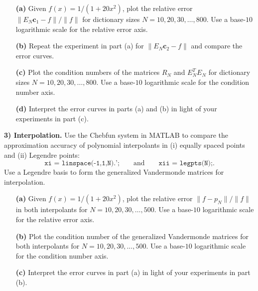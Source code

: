 \documentclass[12pt]{article}
\begin{document}
\begin{itemize}

	\item[\textbf{(a)}] Given $f(x) = 1/(1+20x^2)$, plot the relative error $\|E_N\mathbf{c}_1-f\|/\|f\|$ for dictionary sizes $N=10,20,30,\ldots,800$. Use a base-$10$ logarithmic scale for the relative error axis. 

	\item[\textbf{(b)}] Repeat the experiment in part (a) for $\|E_N\mathbf{c}_2-f\|$ and compare the error curves. 

	\item[\textbf{(c)}] Plot the condition numbers of the matrices $R_N$ and $E_N^TE_N$ for dictionary sizes $N=10,20,30,\ldots,800$. Use a base-$10$ logarithmic scale for the condition number axis. 

	\item[\textbf{(d)}] Interpret the error curves in parts (a) and (b) in light of your experiments in part (c).

\end{itemize} 

\bigskip

\noindent
\textbf{3) Interpolation.} Use the Chebfun system in MATLAB to compare the approximation accuracy of polynomial interpolants in (i) equally spaced points and (ii) Legendre points:
$$
\texttt{xi = linspace(-1,1,N).';} \qquad \text{and} \qquad \texttt{xii = legpts(N);}.
$$
Use a Legendre basis to form the generalized Vandermonde matrices for interpolation.

\begin{itemize}

	\item[\textbf{(a)}]  Given $f(x) = 1/(1+20x^2)$, plot the relative error $\|f-p_N\|/\|f\|$ in both interpolants for $N=10,20,30,\ldots,500$. Use a base-$10$ logarithmic scale for the relative error axis. 

	\item[\textbf{(b)}] Plot the condition number of the generalized Vandermonde matrices for both interpolants for $N=10,20,30,\ldots,500$. Use a base-$10$ logarithmic scale for the condition number axis. 

	\item[\textbf{(c)}] Interpret the error curves in part (a) in light of your experiments in part (b).

\end{itemize} 
\end{document}
